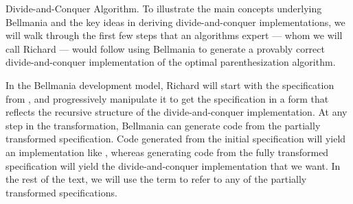\begin{paragraph}{Divide-and-Conquer Algorithm.}
To illustrate the main concepts underlying Bellmania and the key ideas in deriving divide-and-conquer implementations, 
we will walk through the first
few steps that an algorithms expert --- whom we will call Richard --- would follow using Bellmania to generate a provably correct divide-and-conquer implementation of the optimal parenthesization algorithm.

In the Bellmania development model, Richard will start with the specification from , and progressively manipulate it to get the specification in a form that reflects the recursive structure of the divide-and-conquer implementation. At any step in the transformation, Bellmania can generate code from the partially transformed specification. Code generated from the initial specification will yield an implementation like , whereas generating code from the fully transformed specification will yield the divide-and-conquer implementation that we want.
In the rest of the text, we will use the term  to refer to any of the partially transformed specifications.





\end{paragraph}
